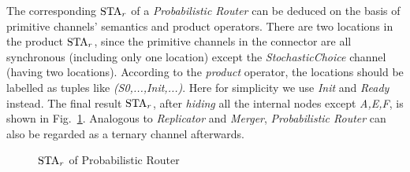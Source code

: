 \begin{example}
The corresponding $\mbox{STA}_r$ of a \emph{Probabilistic Router} can be deduced on the basis of primitive channels' semantics and product operators.
There are two locations in the product $\mbox{STA}_r$, since the primitive channels in the connector are all synchronous (including only one location) except the \emph{StochasticChoice} channel (having two locations). According to the \emph{product} operator, the locations should be labelled as tuples like \emph{(S0,...,Init,...)}. Here for simplicity we use \emph{Init} and \emph{Ready} instead.
The final result $\mbox{STA}_r$, after \emph{hiding} all the internal nodes except \emph{A,E,F}, is shown in Fig.~\ref{fig:probabilistic_router}. Analogous to \emph{Replicator} and \emph{Merger}, \emph{Probabilistic Router} can also be regarded as a ternary channel afterwards.
\begin{figure}[H]
\centering

\caption{$\mbox{STA}_r$ of Probabilistic Router}
\label{fig:probabilistic_router}
\end{figure}
\end{example}

